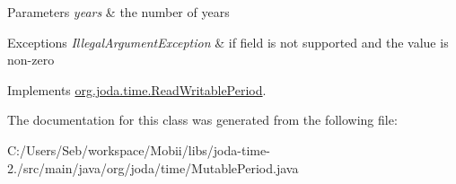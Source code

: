 \begin{DoxyParams}{Parameters}
{\em years} & the number of years \\
\hline
\end{DoxyParams}

\begin{DoxyExceptions}{Exceptions}
{\em Illegal\-Argument\-Exception} & if field is not supported and the value is non-\/zero \\
\hline
\end{DoxyExceptions}


Implements \hyperlink{interfaceorg_1_1joda_1_1time_1_1_read_writable_period_a2a8e7ef2ca6a7e2ca2412c65cab30588}{org.\-joda.\-time.\-Read\-Writable\-Period}.



The documentation for this class was generated from the following file\-:\begin{DoxyCompactItemize}
\item 
C\-:/\-Users/\-Seb/workspace/\-Mobii/libs/joda-\/time-\/2./src/main/java/org/joda/time/Mutable\-Period.\-java\end{DoxyCompactItemize}
